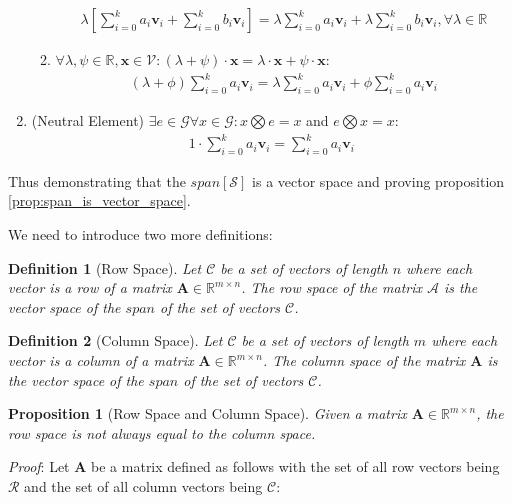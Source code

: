 \documentclass[a4paper,12pt]{book}
\newcommand{\set}[1]{\mathcal{#1}}
\newcommand{\operation}{\bigotimes}
\newcommand{\matrx}[1]{\bm{#1}}
\newcommand{\vectr}[1]{\textbf{#1}}
\newcommand{\real}{\mathbb{R}}
\newcommand{\italic}[1]{\textit{#1}}
\newcommand{\lcomb}[1]{\sum_{i = 0}^{k} {#1} \vectr{v}_i}
\newtheorem{definition}{Definition}[section]
\newtheorem{proposition}{Proposition}[section]
\begin{document}
\begin{enumerate}
\begin{enumerate}
			\begin{align}
				\lambda \left[ \lcomb{a_i} + \lcomb{b_i} \right] = \lambda \lcomb{a_i} + \lambda \lcomb{b_i}, \forall \lambda \in \real
			\end{align}
			\item $\forall \lambda, \psi \in \real, \vectr{x} \in \set{V}: (\lambda + \psi) \cdot \vectr{x} = \lambda \cdot \vectr{x} + \psi \cdot \vectr{x}$:
			\begin{align}
				(\lambda + \phi)\lcomb{a_i} = \lambda \lcomb{a_i} + \phi \lcomb{a_i}
			\end{align}
		\end{enumerate} 
		\item (Neutral Element) $ \exists e  \in \set{G} \forall x \in \set{G} : x \operation e = x$ and $ e \operation x = x $: 
		\begin{align}
			1 \cdot \lcomb{a_i} = \lcomb{a_i}
	 	\end{align}
	\end{enumerate}
	Thus demonstrating that the $ span[\set{S}] $ is a vector space and proving proposition \ref{prop:span_is_vector_space}. 
	
	We need to introduce two more definitions: 
	\begin{definition}[Row Space]
		\normalfont Let $\set{C}$ be a set of vectors of length $n$ where each vector is a row of a matrix $\matrx{A} \in \real^{m \times n}$. The row space of the matrix $\set{A}$ is the vector space of the $span$ of the set of vectors $\set{C}$. 
	\end{definition}
	\begin{definition}[Column Space]
		\normalfont Let $\set{C}$ be a set of vectors of length $m$ where each vector is a column of a matrix $\matrx{A} \in \real^{m \times n}$. The column space of the matrix $\matrx{A}$ is the vector space of the $span$ of the set of vectors $\set{C}$. 
	\end{definition}
	\begin{proposition}[Row Space and Column Space]
		\normalfont Given a matrix $ \matrx{A} \in \real^{m \times n} $, the row space is not always equal to the column space.
	\end{proposition}
	\italic{Proof}: Let $ \matrx{A} $ be a matrix defined as follows with the set of all row vectors being $ \set{R} $ and the set of all column vectors being $ \set{C} $:
	
\end{document}
